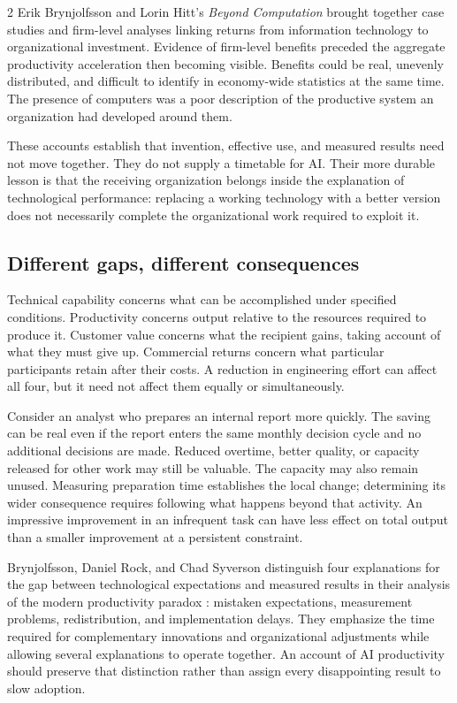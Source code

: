 \begin{multicols}{2}
Erik Brynjolfsson and Lorin Hitt's \emph{Beyond Computation}
\citep{brynjolfsson2000computation} brought together case studies and
firm-level analyses linking returns from information technology to
organizational investment. Evidence of firm-level benefits preceded the
aggregate productivity acceleration then becoming visible. Benefits
could be real, unevenly distributed, and difficult to identify in
economy-wide statistics at the same time. The presence of computers was
a poor description of the productive system an organization had
developed around them.

These accounts establish that invention, effective use, and measured
results need not move together. They do not supply a timetable for AI.
Their more durable lesson is that the receiving organization belongs
inside the explanation of technological performance: replacing a working
technology with a better version does not necessarily complete the
organizational work required to exploit it.

\subsection{Different gaps, different
consequences}\label{different-gaps-different-consequences}

Technical capability concerns what can be accomplished under specified
conditions. Productivity concerns output relative to the resources
required to produce it. Customer value concerns what the recipient
gains, taking account of what they must give up. Commercial returns
concern what particular participants retain after their costs. A
reduction in engineering effort can affect all four, but it need not
affect them equally or simultaneously.

Consider an analyst who prepares an internal report more quickly. The
saving can be real even if the report enters the same monthly decision
cycle and no additional decisions are made. Reduced overtime, better
quality, or capacity released for other work may still be valuable. The
capacity may also remain unused. Measuring preparation time establishes
the local change; determining its wider consequence requires following
what happens beyond that activity. An impressive improvement in an
infrequent task can have less effect on total output than a smaller
improvement at a persistent constraint.

Brynjolfsson, Daniel Rock, and Chad Syverson distinguish four
explanations for the gap between technological expectations and measured
results in their analysis of the modern productivity paradox
\citep{brynjolfsson2019paradox}: mistaken expectations, measurement
problems, redistribution, and implementation delays. They emphasize the
time required for complementary innovations and organizational
adjustments while allowing several explanations to operate together. An
account of AI productivity should preserve that distinction rather than
assign every disappointing result to slow adoption.


\end{multicols}

